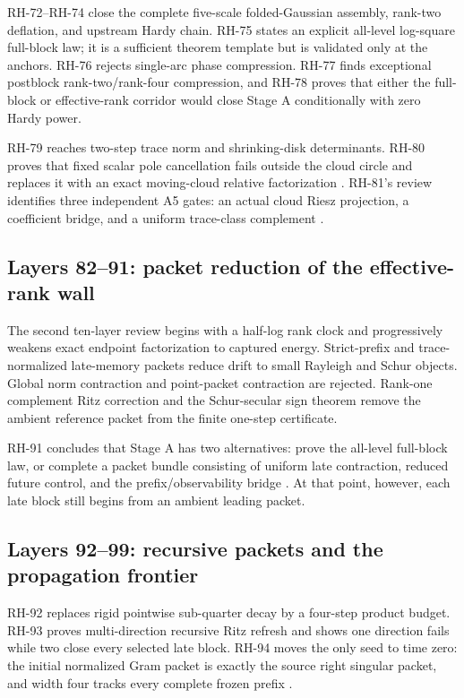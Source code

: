 \documentclass[11pt]{article}
\theoremstyle{definition}
\theoremstyle{remark}
\begin{document}
RH-72--RH-74 close the complete five-scale folded-Gaussian assembly,
rank-two deflation, and upstream Hardy chain.  RH-75 states an explicit
all-level log-square full-block law; it is a sufficient theorem template but
is validated only at the anchors.  RH-76 rejects single-arc phase compression.
RH-77 finds exceptional postblock rank-two/rank-four compression, and RH-78
proves that either the full-block or effective-rank corridor would close
Stage A conditionally with zero Hardy power.

RH-79 reaches two-step trace norm and shrinking-disk determinants.  RH-80
proves that fixed scalar pole cancellation fails outside the cloud circle and
replaces it with an exact moving-cloud relative factorization
\citep{WangCloud2026}.  RH-81's review identifies three independent A5 gates:
an actual cloud Riesz projection, a coefficient bridge, and a uniform
trace-class complement \citep{WangRouteReview2026}.

\subsection{Layers 82--91: packet reduction of the effective-rank wall}

The second ten-layer review begins with a half-log rank clock and progressively
weakens exact endpoint factorization to captured energy.  Strict-prefix and
trace-normalized late-memory packets reduce drift to small Rayleigh and Schur
objects.  Global norm contraction and point-packet contraction are rejected.
Rank-one complement Ritz correction and the Schur-secular sign theorem remove
the ambient reference packet from the finite one-step certificate.

RH-91 concludes that Stage A has two alternatives: prove the all-level
full-block law, or complete a packet bundle consisting of uniform late
contraction, reduced future control, and the prefix/observability bridge
\citep{WangPacketReview2026}.  At that point, however, each late block still
begins from an ambient leading packet.

\subsection{Layers 92--99: recursive packets and the propagation frontier}

RH-92 replaces rigid pointwise sub-quarter decay by a four-step product
budget.  RH-93 proves multi-direction recursive Ritz refresh and shows one
direction fails while two close every selected late block.  RH-94 moves the
only seed to time zero: the initial normalized Gram packet is exactly the
source right singular packet, and width four tracks every complete frozen
prefix \citep{WangSourceSeed2026}.
\end{document}
